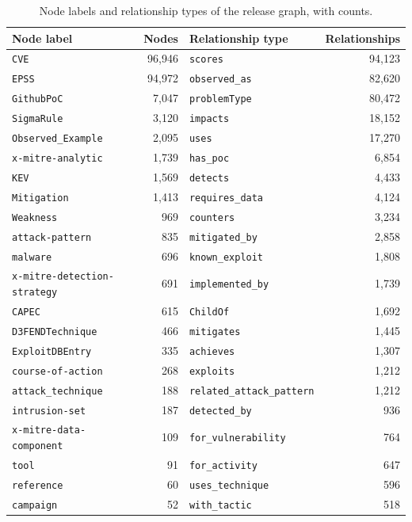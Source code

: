 \documentclass[twocolumn]{svjour3}
\begin{document}
\begin{appendix}
\begin{table}
\centering\small
\caption{Node labels and relationship types of the release graph, with counts.}\label{tab:graphcounts}
\begin{tabular}{@{}lr@{\qquad}lr@{}}
\toprule Node label & Nodes & Relationship type & Relationships \\\midrule
\texttt{CVE} & 96,946 & \texttt{scores} & 94,123 \\
\texttt{EPSS} & 94,972 & \texttt{observed\_as} & 82,620 \\
\texttt{GithubPoC} & 7,047 & \texttt{problemType} & 80,472 \\
\texttt{SigmaRule} & 3,120 & \texttt{impacts} & 18,152 \\
\texttt{Observed\_Example} & 2,095 & \texttt{uses} & 17,270 \\
\texttt{x-mitre-analytic} & 1,739 & \texttt{has\_poc} & 6,854 \\
\texttt{KEV} & 1,569 & \texttt{detects} & 4,433 \\
\texttt{Mitigation} & 1,413 & \texttt{requires\_data} & 4,124 \\
\texttt{Weakness} & 969 & \texttt{counters} & 3,234 \\
\texttt{attack-pattern} & 835 & \texttt{mitigated\_by} & 2,858 \\
\texttt{malware} & 696 & \texttt{known\_exploit} & 1,808 \\
\texttt{x-mitre-detection-strategy} & 691 & \texttt{implemented\_by} & 1,739 \\
\texttt{CAPEC} & 615 & \texttt{ChildOf} & 1,692 \\
\texttt{D3FENDTechnique} & 466 & \texttt{mitigates} & 1,445 \\
\texttt{ExploitDBEntry} & 335 & \texttt{achieves} & 1,307 \\
\texttt{course-of-action} & 268 & \texttt{exploits} & 1,212 \\
\texttt{attack\_technique} & 188 & \texttt{related\_attack\_pattern} & 1,212 \\
\texttt{intrusion-set} & 187 & \texttt{detected\_by} & 936 \\
\texttt{x-mitre-data-component} & 109 & \texttt{for\_vulnerability} & 764 \\
\texttt{tool} & 91 & \texttt{for\_activity} & 647 \\
\texttt{reference} & 60 & \texttt{uses\_technique} & 596 \\
\texttt{campaign} & 52 & \texttt{with\_tactic} & 518 \\

\end{tabular}
\end{table}
\end{appendix}
\end{document}
